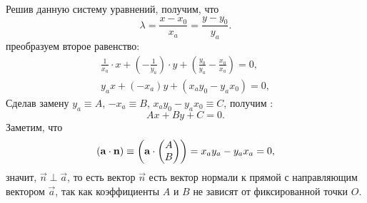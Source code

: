 Решив данную систему уравнений, получим, что
\begin{equation*}
    \lambda = \frac{x - x_0}{x_a} = \frac{y - y_0}{y_a}.
\end{equation*}
преобразуем второе равенство:
\begin{gather*}
    \frac{1}{x_a} \cdot x + \left( - \frac{1}{y_a} \right) \cdot y + \left( \frac{y_0}{y_a} - \frac{x_0}{x_a} \right) = 0,\\
    y_a x + (-x_a)y + (x_a y_0 - y_a x_0) = 0,
\end{gather*}
Сделав замену $y_a \equiv A$, $-x_a \equiv B$, $x_a y_0 - y_a x_0 \equiv C$, получим :
\begin{equation}
    Ax + By + C = 0.
\end{equation}
Заметим, что
\begin{equation*}
    \left(\mathbf{a} \cdot \mathbf{n}\right) \equiv \left(\mathbf{a} \cdot \mathbf{
    \begin{pmatrix}
        A\\
        B
    \end{pmatrix}}\right) = x_a y_a - y_a x_a = 0,
\end{equation*}
значит, $\vec{n} \perp \vec{a}$, то есть вектор $\vec{n}$ есть вектор нормали к прямой с направляющим вектором $\vec{a}$, так как коэффициенты $A$ и $B$ не зависят от фиксированной точки $O$.
